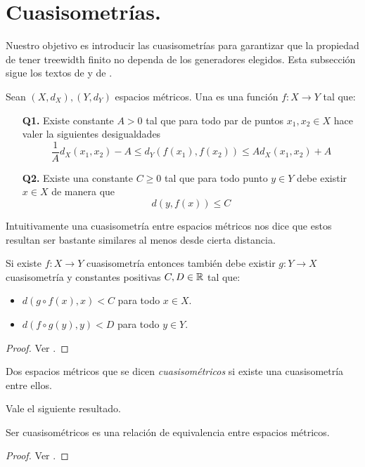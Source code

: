 \documentclass[tesis.tex]{subfiles}
\begin{document}
\section{Cuasisometrías.}

Nuestro objetivo es introducir las cuasisometrías para garantizar que la propiedad de tener treewidth finito no dependa de los generadores elegidos.
Esta subsección sigue los textos de \cite{bridson2013metric} y de \cite{loh2017geometric}.

\begin{deff}
	Sean $(X,d_X),(Y,d_Y)$ espacios métricos. 
	Una  es una función $f:X \to Y$ tal que:
	\begin{itemize}
		\item[\textbf{Q1.}] Existe constante $A > 0$ tal que para todo par de puntos $x_1,x_2 \in X$ hace valer la siguientes desigualdades
		\[
		\frac{1}{A} d_X(x_1,x_2) - A \le d_Y(f(x_1),f(x_2)) \le A d_X(x_1,x_2) + A
		\]
		\item[\textbf{Q2.}] Existe una constante $C \ge 0$ tal que para todo punto $y \in Y$ debe existir $x \in X$ de manera que 
		\[
		d(y,f(x)) \le C
		\]
	\end{itemize}
\end{deff}

Intuitivamente una cuasisometría entre espacios métricos nos dice que estos resultan ser bastante similares al menos desde cierta distancia. 
\medskip
\begin{prop}
	Si existe $f:X \to Y$ cuasisometría entonces también debe existir $g:Y \to X$ cuasisometría y constantes positivas $C,D \in \mathbb{R}$ tal que:
	\begin{itemize}
		\item $d(g \circ f (x), x) < C$ para todo $x \in X$.
		\item $d(f \circ g (y), y) < D$ para todo $y \in Y$. 
	\end{itemize}
\end{prop}
\begin{proof}
	Ver \cite{loh2017geometric}.
\end{proof}

\begin{deff}
	Dos espacios métricos que se dicen \emph{cuasisométricos} si existe una cuasisometría entre ellos.
\end{deff}

Vale el siguiente resultado.
\begin{prop}
	Ser cuasisométricos es una relación de equivalencia entre espacios métricos.
\end{prop}
\begin{proof}
	Ver \cite{loh2017geometric}.
\end{proof}
\end{document}
